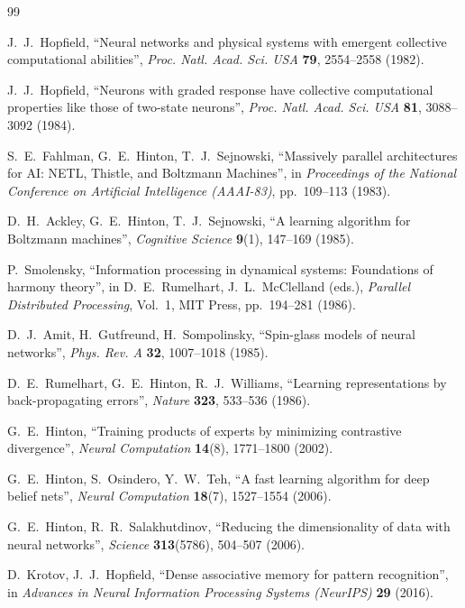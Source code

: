 \documentclass[12pt]{article}
\begin{document}
\begin{thebibliography}{99}

J.~J.~Hopfield,
``Neural networks and physical systems with emergent collective computational abilities'',
\textit{Proc. Natl. Acad. Sci. USA} \textbf{79}, 2554--2558 (1982).

J.~J.~Hopfield,
``Neurons with graded response have collective computational properties like those of two-state neurons'',
\textit{Proc. Natl. Acad. Sci. USA} \textbf{81}, 3088--3092 (1984).

S.~E.~Fahlman, G.~E.~Hinton, T.~J.~Sejnowski,
``Massively parallel architectures for AI: NETL, Thistle, and Boltzmann Machines'',
in \textit{Proceedings of the National Conference on Artificial Intelligence (AAAI-83)}, pp.~109--113 (1983).

D.~H.~Ackley, G.~E.~Hinton, T.~J.~Sejnowski,
``A learning algorithm for Boltzmann machines'',
\textit{Cognitive Science} \textbf{9}(1), 147--169 (1985).

P.~Smolensky,
``Information processing in dynamical systems: Foundations of harmony theory'',
in D.~E.~Rumelhart, J.~L.~McClelland (eds.), \textit{Parallel Distributed Processing}, Vol.~1, MIT Press, pp.~194--281 (1986).

D.~J.~Amit, H.~Gutfreund, H.~Sompolinsky,
``Spin-glass models of neural networks'',
\textit{Phys. Rev. A} \textbf{32}, 1007--1018 (1985).

D.~E.~Rumelhart, G.~E.~Hinton, R.~J.~Williams,
``Learning representations by back-propagating errors'',
\textit{Nature} \textbf{323}, 533--536 (1986).

G.~E.~Hinton,
``Training products of experts by minimizing contrastive divergence'',
\textit{Neural Computation} \textbf{14}(8), 1771--1800 (2002).

G.~E.~Hinton, S.~Osindero, Y.~W.~Teh,
``A fast learning algorithm for deep belief nets'',
\textit{Neural Computation} \textbf{18}(7), 1527--1554 (2006).

G.~E.~Hinton, R.~R.~Salakhutdinov,
``Reducing the dimensionality of data with neural networks'',
\textit{Science} \textbf{313}(5786), 504--507 (2006).

D.~Krotov, J.~J.~Hopfield,
``Dense associative memory for pattern recognition'',
in \textit{Advances in Neural Information Processing Systems (NeurIPS)} \textbf{29} (2016).


\end{thebibliography}
\end{document}
